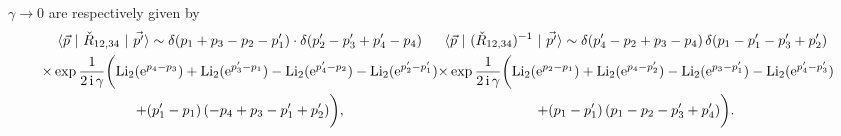 \documentclass[12pt]{article}
\numberwithin{equation}{section}
\newcommand{\Li}{\mathrm{Li}_2}
\begin{document}
$\gamma \to 0$
are
respectively given by
\begin{subequations}
\label{R_asymptotics}
\begin{multline}
  \langle \vec{p} \ | \
  \Check{R}_{1 2, 3 4} \
  | \ \vec{p^\prime} \rangle
  \sim
  \delta(p_1 + p_3 - p_2 - p_1^\prime ) \cdot
  \delta(p_2^\prime - p_3^\prime + p_4^\prime - p_4)
  \\
  \times
  \exp
  \frac{1}{2 \, \mathrm{i} \, \gamma}
  \biggl(
  \Li( \mathrm{e}^{p_4  - p_3} )
  +  \Li( \mathrm{e}^{p_3^\prime - p_1} )
  -  \Li( \mathrm{e}^{p_4^\prime - p_2} )
  -  \Li( \mathrm{e}^{p_2^\prime - p_1^\prime} )
  \\
  + ( p_1^\prime - p_1) \,
  (-p_4 + p_3 - p_1^\prime + p_2^\prime)
  \biggr) ,
%
\end{multline}
\begin{multline}
  \langle \vec{p} \ |  \
  ( \Check{R}_{1 2, 3 4} )^{-1} \ | \
  \vec{p^\prime} \rangle
  \sim
  \delta(p_4^\prime  -p_2+p_3- p_4) \,
  \delta(p_1 - p_1^\prime - p_3^\prime  + p_2^\prime) 
  \\
  \times
  \exp \frac{1}{2 \, \mathrm{i} \, \gamma}
  \biggl(
    \Li(\mathrm{e}^{p_2 - p_1}) 
    + \Li(\mathrm{e}^{p_4 - p_2^\prime})
    - \Li(\mathrm{e}^{p_3 - p_1^\prime})
    - \Li(\mathrm{e}^{p_4^\prime - p_3^\prime})
    \\
    + (p_1 - p_1^\prime) \, (p_1 - p_2 - p_3^\prime + p_4^\prime)
  \biggr) .
\end{multline}
\end{subequations}
\end{document}
